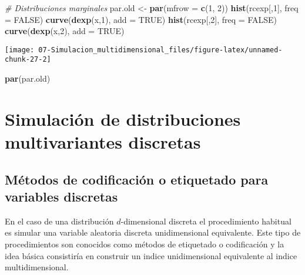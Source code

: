 \documentclass[
]{book}
\newenvironment{Shaded}{\begin{snugshade}}{\end{snugshade}}
\newcommand{\CommentTok}[1]{\textcolor[rgb]{0.56,0.35,0.01}{\textit{#1}}}
\newcommand{\DataTypeTok}[1]{\textcolor[rgb]{0.13,0.29,0.53}{#1}}
\newcommand{\DecValTok}[1]{\textcolor[rgb]{0.00,0.00,0.81}{#1}}
\newcommand{\KeywordTok}[1]{\textcolor[rgb]{0.13,0.29,0.53}{\textbf{#1}}}
\newcommand{\NormalTok}[1]{#1}
\newcommand{\OtherTok}[1]{\textcolor[rgb]{0.56,0.35,0.01}{#1}}
\newcommand{\StringTok}[1]{\textcolor[rgb]{0.31,0.60,0.02}{#1}}
\theoremstyle{break}
\theoremstyle{definition}
\theoremstyle{definition}
\theoremstyle{definition}
\theoremstyle{remark}
\begin{document}
\begin{enumerate}
\begin{Shaded}
\begin{Highlighting}[]
\CommentTok{# Distribuciones marginales}
\NormalTok{par.old <-}\StringTok{ }\KeywordTok{par}\NormalTok{(}\DataTypeTok{mfrow =} \KeywordTok{c}\NormalTok{(}\DecValTok{1}\NormalTok{, }\DecValTok{2}\NormalTok{))}
\KeywordTok{hist}\NormalTok{(rcexp[,}\DecValTok{1}\NormalTok{], }\DataTypeTok{freq =} \OtherTok{FALSE}\NormalTok{)}
\KeywordTok{curve}\NormalTok{(}\KeywordTok{dexp}\NormalTok{(x,}\DecValTok{1}\NormalTok{), }\DataTypeTok{add =} \OtherTok{TRUE}\NormalTok{)}
\KeywordTok{hist}\NormalTok{(rcexp[,}\DecValTok{2}\NormalTok{], }\DataTypeTok{freq =} \OtherTok{FALSE}\NormalTok{)}
\KeywordTok{curve}\NormalTok{(}\KeywordTok{dexp}\NormalTok{(x,}\DecValTok{2}\NormalTok{), }\DataTypeTok{add =} \OtherTok{TRUE}\NormalTok{)}
\end{Highlighting}
\end{Shaded}

  \begin{center}\texttt{[image: 07-Simulacion\_multidimensional\_files/figure-latex/unnamed-chunk-27-2]} \end{center}

\begin{Shaded}
\begin{Highlighting}[]
\KeywordTok{par}\NormalTok{(par.old)}
\end{Highlighting}
\end{Shaded}
\end{enumerate}

\hypertarget{mult-discr}{%
\section{Simulación de distribuciones multivariantes discretas}\label{mult-discr}}

\hypertarget{muxe9todos-de-codificaciuxf3n-o-etiquetado-para-variables-discretas}{%
\subsection{Métodos de codificación o etiquetado para variables discretas}\label{muxe9todos-de-codificaciuxf3n-o-etiquetado-para-variables-discretas}}

En el caso de una distribución \(d\)-dimensional discreta
el procedimiento habitual es simular una variable aleatoria discreta
unidimensional equivalente.
Este tipo de procedimientos son conocidos como métodos de etiquetado o
codificación y la idea básica consistiría en construir un
indice unidimensional equivalente al indice multidimensional.
\end{document}
